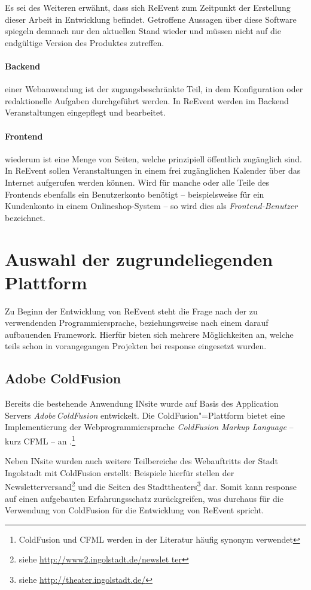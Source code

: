 Es sei des Weiteren erwähnt, dass sich ReEvent zum Zeitpunkt der Erstellung dieser Arbeit in Entwicklung befindet. Getroffene Aussagen über diese Software spiegeln demnach nur den aktuellen Stand wieder und müssen nicht auf die endgültige Version des Produktes zutreffen.

\paragraph{Backend} einer Webanwendung ist der zugangsbeschränkte Teil, in dem Konfiguration oder redaktionelle Aufgaben durchgeführt werden. In ReEvent werden im Backend Veranstaltungen eingepflegt und bearbeitet.

\paragraph{Frontend} wiederum ist eine Menge von Seiten, welche prinzipiell öffentlich zugänglich sind. In ReEvent sollen Veranstaltungen in einem frei zugänglichen Kalender über das Internet aufgerufen werden können. Wird für manche oder alle Teile des Frontends ebenfalls ein Benutzerkonto benötigt -- beispielsweise für ein Kundenkonto in einem Onlineshop-System -- so wird dies als \emph{Frontend-Benutzer} bezeichnet.

\section{Auswahl der zugrundeliegenden Plattform}

Zu Beginn der Entwicklung von ReEvent steht die Frage nach der zu verwendenden Programmiersprache, beziehungsweise nach einem darauf aufbauenden Framework. Hierfür bieten sich mehrere Möglichkeiten an, welche teils schon in vorangegangen Projekten bei response eingesetzt wurden.

\subsection{Adobe ColdFusion}

Bereits die bestehende Anwendung INsite wurde auf Basis des Application Servers \emph{Adobe\,ColdFusion} entwickelt. Die ColdFusion"=Plattform bietet eine Implementierung der Webprogrammiersprache \emph{ColdFusion Markup Language} -- kurz CFML -- an \cite[S. 8]{Forta.2010}.\footnote{ColdFusion und CFML werden in der Literatur häufig synonym verwendet}

Neben INsite wurden auch weitere Teilbereiche des Webauftritts der Stadt Ingolstadt mit ColdFusion erstellt: Beispiele hierfür stellen der Newsletterversand\footnote{ siehe \url{http://www2.ingolstadt.de/newslet
ter}} und die Seiten des Stadttheaters\footnote{ siehe \url{http://theater.ingolstadt.de/}} dar. Somit kann response auf einen aufgebauten Erfahrungsschatz zurückgreifen, was durchaus für die Verwendung von ColdFusion für die Entwicklung von ReEvent spricht.

